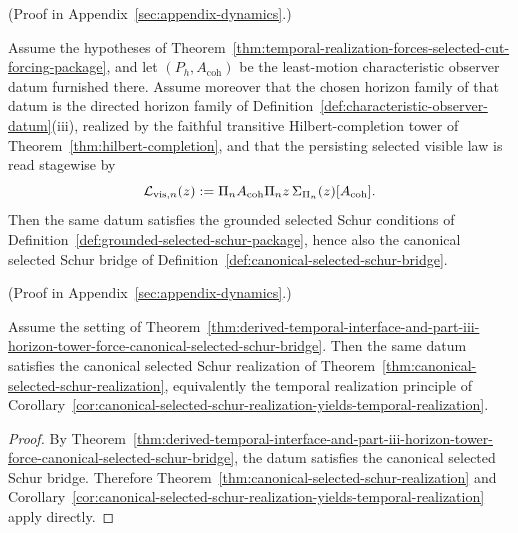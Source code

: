 (Proof in Appendix~\ref{sec:appendix-dynamics}.)

\begin{theorem}
\label{thm:derived-temporal-interface-and-part-iii-horizon-tower-force-canonical-selected-schur-bridge}
Assume the hypotheses of
Theorem~\ref{thm:temporal-realization-forces-selected-cut-forcing-package}, and
let \((P_h,A_{\mathrm{coh}})\) be the least-motion characteristic observer
datum furnished there. Assume moreover that the chosen horizon family of that
datum is the directed horizon family of
Definition~\ref{def:characteristic-observer-datum}(iii), realized by the
faithful transitive Hilbert-completion tower of
Theorem~\ref{thm:hilbert-completion}, and that the persisting selected visible
law is read stagewise by
\[
\mathcal L_{\mathrm{vis},n}(z):=
\Pi_{n}A_{\mathrm{coh}}\Pi_{n}
 z\,\Sigma_{\Pi_{n}}(z)[A_{\mathrm{coh}}].
\]
Then the same datum satisfies the grounded selected Schur conditions of
Definition~\ref{def:grounded-selected-schur-package}, hence also the canonical
selected Schur bridge of Definition~\ref{def:canonical-selected-schur-bridge}.
\end{theorem}

(Proof in Appendix~\ref{sec:appendix-dynamics}.)

\begin{corollary}
\label{cor:derived-temporal-interface-and-part-iii-horizon-tower-force-canonical-selected-schur-realization}
Assume the setting of
Theorem~\ref{thm:derived-temporal-interface-and-part-iii-horizon-tower-force-canonical-selected-schur-bridge}.
Then the same datum satisfies the canonical selected Schur realization of
Theorem~\ref{thm:canonical-selected-schur-realization}, equivalently the
temporal realization principle of
Corollary~\ref{cor:canonical-selected-schur-realization-yields-temporal-realization}.
\end{corollary}

\begin{proof}
By
Theorem~\ref{thm:derived-temporal-interface-and-part-iii-horizon-tower-force-canonical-selected-schur-bridge},
the datum satisfies the canonical selected Schur bridge. Therefore
Theorem~\ref{thm:canonical-selected-schur-realization} and
Corollary~\ref{cor:canonical-selected-schur-realization-yields-temporal-realization}
apply directly.
\end{proof}

